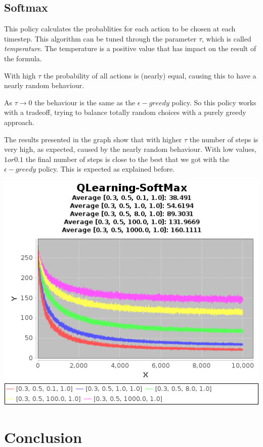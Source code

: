 \documentclass{article}
\begin{document}
\subsection{Softmax}
\label{softmax}

This policy calculates the probablities for each action to be chosen at each
timestep. This algorithm can be tuned through the parameter $\tau$, which is
called \emph{temperature}.
The temperature is a positive value that has impact on the result of the
formula.

With high $\tau$ the probability of all actions is (nearly) equal, causing
this to have a nearly random behaviour.

As $\tau \rightarrow 0$ the behaviour is the same as the $\epsilon-greedy$
policy.
So this policy works with a tradeoff, trying to balance totally random choices with a purely greedy approach.

The results presented in the graph show that with higher $\tau$ the number of
steps is very high, as expected, caused by the nearly random behaviour. With low
values, $1 or 0.1$ the final number of steps is close to the best that we got
with the $\epsilon-greedy$ policy. This is expected as explained before.

\includegraphics[]{res/alpha_03_gamma_05_temp_01_to_1000_IV_1.png}

\section{Conclusion}
\end{document}
